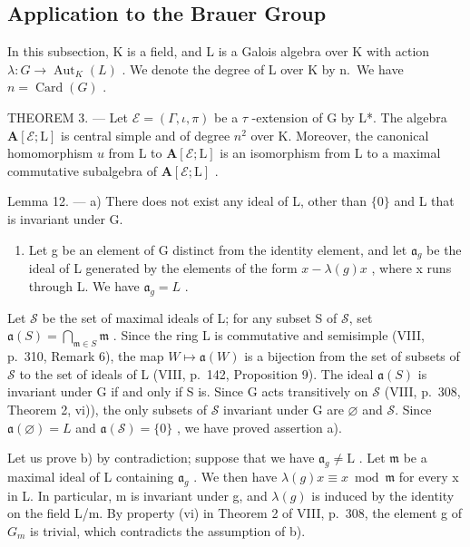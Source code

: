 \subsection{Application to the Brauer Group}

In this subsection, K is a field, and L is a Galois algebra over K with action \(\lambda: G \to \operatorname{Aut}_{K}(L)\) . We denote the degree of L over K by n.~We have \(n = \operatorname{Card}(G)\) .

THEOREM 3. --- Let \(\mathcal{E} = (\Gamma, \iota, \pi)\) be a \(\tau\) -extension of G by L*. The algebra \(\mathbf{A}[\mathcal{E}; \mathrm{L}]\) is central simple and of degree \(n^2\) over K. Moreover, the canonical homomorphism \(u\) from L to \(\mathbf{A}[\mathcal{E}; \mathrm{L}]\) is an isomorphism from L to a maximal commutative subalgebra of \(\mathbf{A}[\mathcal{E}; \mathrm{L}]\) .

Lemma 12. --- a) There does not exist any ideal of L, other than \(\{0\}\) and L that is invariant under G.

\begin{enumerate}
\def\labelenumi{\alph{enumi})}
\setcounter{enumi}{1}
\tightlist
\item
  Let g be an element of G distinct from the identity element, and let \(\mathfrak{a}_{g}\) be the ideal of L generated by the elements of the form \(x - \lambda(g)x\) , where x runs through L. We have \(\mathfrak{a}_{g} = L\) .
\end{enumerate}

Let \(\mathscr{S}\) be the set of maximal ideals of L; for any subset S of \(\mathscr{S}\), set \(\mathfrak{a}(S) = \bigcap_{\mathfrak{m} \in S} \mathfrak{m}\) . Since the ring L is commutative and semisimple (VIII, p.~310, Remark 6), the map \(W \mapsto \mathfrak{a}(W)\) is a bijection from the set of subsets of \(\mathscr{S}\) to the set of ideals of L (VIII, p.~142, Proposition 9). The ideal \(\mathfrak{a}(S)\) is invariant under G if and only if S is. Since G acts transitively on \(\mathscr{S}\) (VIII, p.~308, Theorem 2, vi)), the only subsets of \(\mathscr{S}\) invariant under G are \(\varnothing\) and \(\mathscr{S}\). Since \(\mathfrak{a}(\varnothing) = L\) and \(\mathfrak{a}(\mathscr{S}) = \{0\}\) , we have proved assertion a).

Let us prove b) by contradiction; suppose that we have \(\mathfrak{a}_g\neq \mathrm{L}\) . Let \(\mathfrak{m}\) be a maximal ideal of L containing \(\mathfrak{a}_g\) . We then have \(\lambda (g)x\equiv x\bmod \mathfrak{m}\) for every x in L. In particular, m is invariant under g, and \(\lambda(g)\) is induced by the identity on the field L/m. By property (vi) in Theorem 2 of VIII, p.~308, the element g of \(G_{m}\) is trivial, which contradicts the assumption of b).


